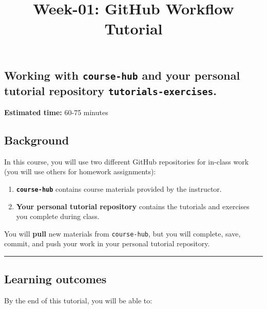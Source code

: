 \documentclass[
  letterpaper,
  DIV=11,
  numbers=noendperiod]{scrartcl}
\title{Week-01: GitHub Workflow Tutorial}
\author{}
\date{}
\providecommand{\tightlist}{%
  \setlength{\itemsep}{0pt}\setlength{\parskip}{0pt}}
\renewcommand*\contentsname{Table of contents}
\newcommand\contentsname{Table of contents}
\begin{document}
\maketitle

\renewcommand*\contentsname{Table of contents}
{
\setcounter{tocdepth}{3}
\tableofcontents
}

\subsection{\texorpdfstring{Working with \texttt{course-hub} and your
personal tutorial repository
\texttt{tutorials-exercises}.}{Working with course-hub and your personal tutorial repository tutorials-exercises.}}\label{working-with-course-hub-and-your-personal-tutorial-repository-tutorials-exercises.}

\textbf{Estimated time:} 60-75 minutes

\subsection{Background}\label{background}

In this course, you will use two different GitHub repositories for
in-class work (you will use others for homework assignments):

\begin{enumerate}
\def\labelenumi{\arabic{enumi}.}
\tightlist
\item
  \textbf{\texttt{course-hub}} contains course materials provided by the
  instructor.
\item
  \textbf{Your personal tutorial repository} contains the tutorials and
  exercises you complete during class.
\end{enumerate}

You will \textbf{pull} new materials from \texttt{course-hub}, but you
will complete, save, commit, and push your work in your personal
tutorial repository.

\begin{center}\rule{0.5\linewidth}{0.5pt}\end{center}

\subsection{Learning outcomes}\label{learning-outcomes}

By the end of this tutorial, you will be able to:
\end{document}
